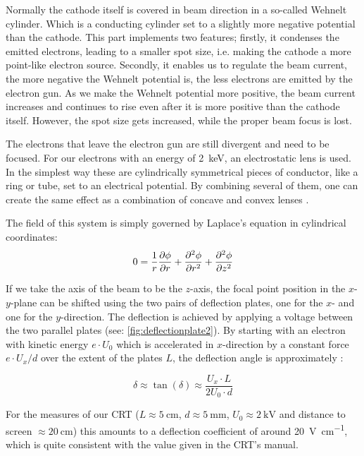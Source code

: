 Normally the cathode itself is covered in beam direction in a so-called Wehnelt cylinder. Which is a conducting cylinder set to a slightly more negative potential than the cathode. This part implements two features; firstly, it condenses the emitted electrons, leading to a smaller spot size, i.e. making the cathode a more point-like electron source. Secondly, it enables us to regulate the beam current, the more negative the Wehnelt potential is, the less electrons are emitted by the electron gun. As we make the Wehnelt potential more positive, the beam current increases and continues to rise even after it is more positive than the cathode itself. However, the spot size gets increased, while the proper beam focus is lost. 

The electrons that leave the electron gun are still divergent and need to be focused. For our electrons with an energy of \SI{2}{\kilo\electronvolt},  an electrostatic lens is used.  In the simplest way these are cylindrically symmetrical pieces of conductor, like a ring or tube, set to an electrical potential. By combining several of them, one can create the same effect as a combination of concave and convex lenses \cite{Demtroeder3}. 

The field of this system is simply governed by Laplace's equation in 
cylindrical coordinates:
\begin{equation}
	0=\dfrac{1}{r}\pdv{\phi}{r}+\pdv[2]{\phi}{r}+\pdv[2]{\phi}{z}
\end{equation}

If we take the axis of the beam to be the $z$-axis, the focal point position in the $x$-$y$-plane can be shifted using the two pairs of deflection plates, one for the $x$- and one for the $y$-direction. The deflection is achieved by applying a voltage between the two parallel plates (see: \cref{fig:deflectionplate2}). By starting with an electron with kinetic energy $e \cdot U_0$ which is accelerated in $x$-direction by a constant force $e\cdot U_x / d$ over the extent of the plates $L$, the deflection angle is approximately \cite{Demtroeder3}:

\begin{equation}\label{key}
	\delta \approx \tan(\delta) \approx \frac{U_x\cdot L}{2 U_0 \cdot d}
\end{equation}


For the measures of our CRT ($ L \approx \SI{5}{\centi\meter}$, $d \approx \SI{5}{\milli\meter}$, $U_0 \approx \SI{2}{\kilo\volt}$ and distance to screen $\approx \SI{20}{\centi\meter}$) this amounts to a deflection coefficient of around \SI{20}{\volt\per\centi\meter}, which is quite consistent with the value given in the CRT's manual.

